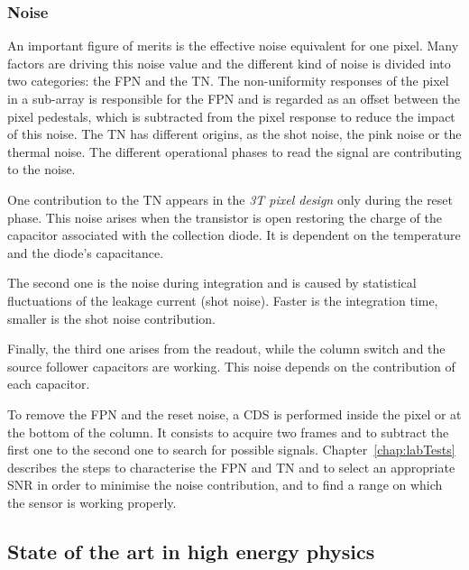     \subsubsection{Noise}

    An important figure of merits is the effective noise equivalent for one pixel.
    Many factors are driving this noise value and the different kind of noise is divided into two categories: the \gls{FPN} and the \gls{TN}.
    The non-uniformity responses of the pixel in a sub-array is responsible for the \gls{FPN} and is regarded as an offset between the pixel pedestals, which is subtracted from the pixel response to reduce the impact of this noise.
    The \gls{TN} has different origins, as the shot noise, the pink noise or the thermal noise.
    The different operational phases to read the signal are contributing to the noise.
    
    One contribution to the \gls{TN} appears in the \textit{3T pixel design} only during the reset phase.
    This noise arises when the transistor is open restoring the charge of the capacitor associated with the collection diode.
    It is dependent on the temperature and the diode's capacitance.
    
    The second one is the noise during integration and is caused by statistical fluctuations of the leakage current (shot noise).
    Faster is the integration time, smaller is the shot noise contribution.
    
    Finally, the third one arises from the readout, while the column switch and the source follower capacitors are working.
    This noise depends on the contribution of each capacitor.
    
    To remove the \gls{FPN} and the reset noise, a \gls{CDS} is performed inside the pixel or at the bottom of the column.
    It consists to acquire two frames and to subtract the first one to the second one to search for possible signals.
    Chapter~\ref{chap:labTests} describes the steps to characterise the \gls{FPN} and \gls{TN} and to select an appropriate \gls{SNR} in order to minimise the noise contribution, and to find a range on which the sensor is working properly.


    \subsection{State of the art in high energy physics}
    \label{subsec:Mi26}

